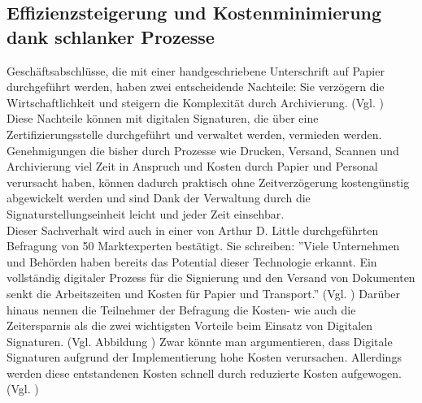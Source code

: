 \documentclass[deutsch]{lib/llncs/llncs}
\begin{document}
\subsection{Effizienzsteigerung und Kostenminimierung dank schlanker Prozesse}
Geschäftsabschlüsse, die mit einer handgeschriebene Unterschrift auf Papier durchgeführt werden, haben zwei entscheidende Nachteile: Sie verzögern die Wirtschaftlichkeit und steigern die Komplexität durch Archivierung. (Vgl. \cite[S. 3]{Zitat05})\\
Diese Nachteile können mit digitalen Signaturen, die über eine Zertifizierungsstelle durchgeführt und verwaltet werden, vermieden werden. Genehmigungen die bisher durch Prozesse wie Drucken, Versand, Scannen und Archivierung viel Zeit in Anspruch und Kosten durch Papier und Personal verursacht haben, können dadurch praktisch ohne Zeitverzögerung kostengünstig abgewickelt werden und sind Dank der Verwaltung durch die Signaturstellungseinheit leicht und jeder Zeit einsehbar. \\
Dieser Sachverhalt wird auch in einer von Arthur D. Little durchgeführten Befragung von 50 Marktexperten bestätigt. Sie schreiben: ''Viele Unternehmen und Behörden haben bereits das Potential dieser Technologie erkannt. Ein vollständig digitaler Prozess für die Signierung und den Versand von Dokumenten senkt die Arbeitszeiten und Kosten für Papier und Transport.'' (Vgl. \cite[S. 7]{Zitat05})
Darüber hinaus nennen die Teilnehmer der Befragung die Kosten- wie auch die Zeitersparnis als die zwei wichtigsten Vorteile beim Einsatz von Digitalen Signaturen. (Vgl. Abbildung \cite[S. 7]{Zitat05})
Zwar könnte man argumentieren, dass Digitale Signaturen aufgrund der Implementierung hohe Kosten verursachen. Allerdings werden diese entstandenen Kosten schnell durch reduzierte Kosten aufgewogen. (Vgl. \cite[S. 7]{Zitat05})
\end{document}
